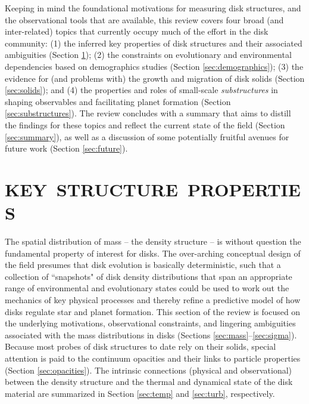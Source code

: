 \documentclass[a4paper]{ar-1col}
\begin{document}
Keeping in mind the foundational motivations for measuring disk structures, and the observational tools that are available, this review covers four broad (and inter-related) topics that currently occupy much of the effort in the disk community: (1) the inferred key properties of disk structures and their associated ambiguities (Section \ref{sec:structure}); (2) the constraints on evolutionary and environmental dependencies based on demographics studies (Section \ref{sec:demographics}); (3) the evidence for (and problems with) the growth and migration of disk solids (Section \ref{sec:solids}); and (4) the properties and roles of small-scale {\it substructures} in shaping observables and facilitating planet formation (Section \ref{sec:substructures}).  The review concludes with a summary that aims to distill the findings for these topics and reflect the current state of the field (Section \ref{sec:summary}), as well as a discussion of some potentially fruitful avenues for future work (Section \ref{sec:future}).  




\section{KEY\ STRUCTURE\ PROPERTIES} \label{sec:structure}

The spatial distribution of mass -- the density structure -- is without question the fundamental property of interest for disks.  The over-arching conceptual design of the field presumes that disk evolution is basically deterministic, such that a collection of ``snapshots" of disk density distributions that span an appropriate range of environmental and evolutionary states could be used to work out the mechanics of key physical processes and thereby refine a predictive model of how disks regulate star and planet formation.  This section of the review is focused on the underlying motivations, observational constraints, and lingering ambiguities associated with the mass distributions in disks (Sections \ref{sec:mass}--\ref{sec:sigma}).  Because most probes of disk structures to date rely on their solids, special attention is paid to the continuum opacities and their links to particle properties (Section \ref{sec:opacities}).  The intrinsic connections (physical and observational) between the density structure and the thermal and dynamical state of the disk material are summarized in Section \ref{sec:temp} and \ref{sec:turb}, respectively.        
\end{document}
